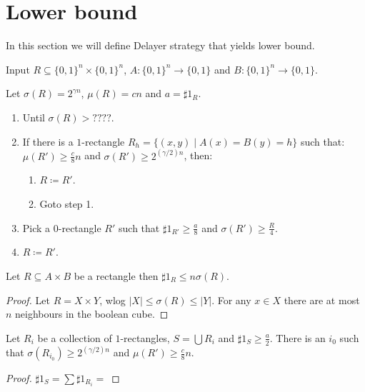 \section{Lower bound}

In this section we will define Delayer strategy that yields lower bound.

\begin{algorithm}
    Input $R \subseteq \{0, 1\}^n \times \{0, 1\}^n$, $A:\{0, 1\}^n \to \{0, 1\}$ and $B:\{0, 1\}^n \to
    \{0, 1\}$.

    Let $\sigma(R) = 2^{\gamma n}$, $\mu(R) = c n$ and $a = \sharp 1_R$.

    \begin{enumerate}
        \item Until $\sigma(R) > ????$.
        \item If there is a $1$-rectangle $R_h = \{(x, y) \mid A(x) = B(y) = h\}$ such that: $\mu(R') \ge
            \frac{c}{8} n$ and $\sigma(R') \ge 2^{(\gamma / 2) n}$, then:
            \begin{enumerate}
                \item $R \coloneqq R'$.
                \item Goto step 1.
            \end{enumerate}
            
        \item Pick a $0$-rectangle $R'$ such that $\sharp 1_{R'} \ge \frac{a}{8}$ and $\sigma(R') \ge
            \frac{R}{4}$.
        \item $R \coloneqq R'$.
    \end{enumerate}
\end{algorithm}

\begin{lemma}
    Let $R \subseteq A \times B$ be a rectangle then $\sharp 1_R \le n \sigma(R)$.
\end{lemma}

\begin{proof}
    Let $R = X \times Y$, wlog $|X| \le \sigma(R) \le |Y|$. For any $x \in X$ there are at most $n$
    neighbours in the boolean cube.
\end{proof}

\begin{lemma}
    Let $R_i$ be a collection of $1$-rectangles, $S = \bigcup R_i$ and $\sharp 1_{S} \ge
    \frac{a}{2}$. There is an $i_0$ such that $\sigma(R_{i_0}) \ge 2^{(\gamma / 2) n}$ and $\mu(R') \ge
    \frac{c}{8} n$.
\end{lemma}

\begin{proof}
    $\sharp 1_{S} = \sum \sharp 1_{R_i} = $
\end{proof}
